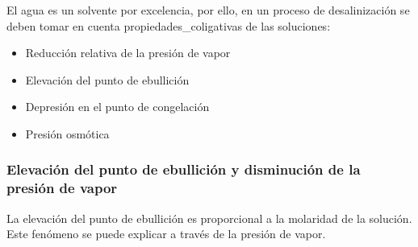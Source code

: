 		El agua es un solvente por excelencia, por ello, en un proceso de desalinización se deben tomar en cuenta \gls{propiedades_coligativas} de las soluciones:
		
		\begin{itemize}[columns=2]
			\item Reducción relativa de la presión de vapor
			\item Elevación del punto de ebullición
			\item Depresión en el punto de congelación
			\item Presión osmótica
		\end{itemize}
		
		\subsubsection{Elevación del punto de ebullición y disminución de la presión de vapor}
			
			La elevación del punto de ebullición es proporcional a la molaridad de la solución. Este fenómeno se puede explicar a través de la presión de vapor.
			
